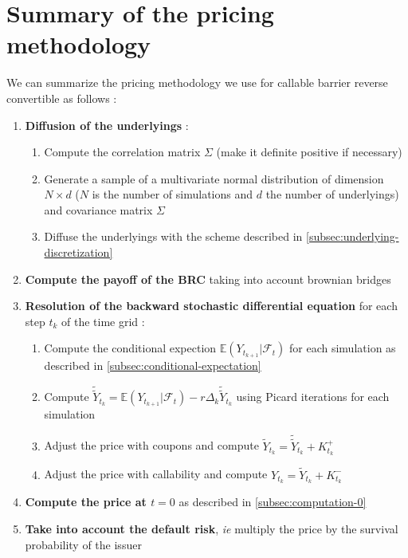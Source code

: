 \documentclass[a4paper,11pt,english]{book}
\begin{document}
\section{Summary of the pricing methodology}
\label{sec:summary}
We can summarize the pricing methodology we use for callable barrier reverse convertible as follows :
\begin{enumerate}
    \item \textbf{Diffusion of the underlyings} :
    \begin{enumerate}
        \item Compute the correlation matrix $\Sigma$ (make it definite positive if necessary)
        \item Generate a sample of a multivariate normal distribution of dimension $N\times d$ ($N$ is the number of simulations and $d$ the number of underlyings) and covariance matrix  $\Sigma$ 
        \item Diffuse the underlyings with the scheme described in \ref{subsec:underlying-discretization}
    \end{enumerate}
    \item \textbf{Compute the payoff of the BRC} taking into account brownian bridges
    \item \textbf{Resolution of the backward stochastic differential equation} for each step $t_{k}$ of the time grid :
    \begin{enumerate}
        \item Compute the conditional expection $\mathbb{E}(Y_{t_{k+1}}|\mathcal{F}_{t})$ for each simulation as described in \ref{subsec:conditional-expectation}
        \item Compute $\widetilde{\widetilde{Y}}_{t_{k}}=\mathbb{E}(Y_{t_{k+1}}|\mathcal{F}_{t}) -r\Delta_{k}\widetilde{\widetilde{Y}}_{t_{k}}$ using Picard iterations for each simulation
        \item Adjust the price with coupons and compute $\widetilde{Y}_{t_{k}} = \widetilde{\widetilde{Y}}_{t_{k}} + K_{t_{k}}^{+}$
        \item Adjust the price with callability and compute $Y_{t_{k}} = \widetilde{Y}_{t_{k}} + K_{t_{k}}^{-}$
    \end{enumerate}
    \item \textbf{Compute the price at $t=0$} as described in \ref{subsec:computation-0}
    \item \textbf{Take into account the default risk}, \textit{ie} multiply the price by the survival probability of the issuer
\end{enumerate}
\end{document}
